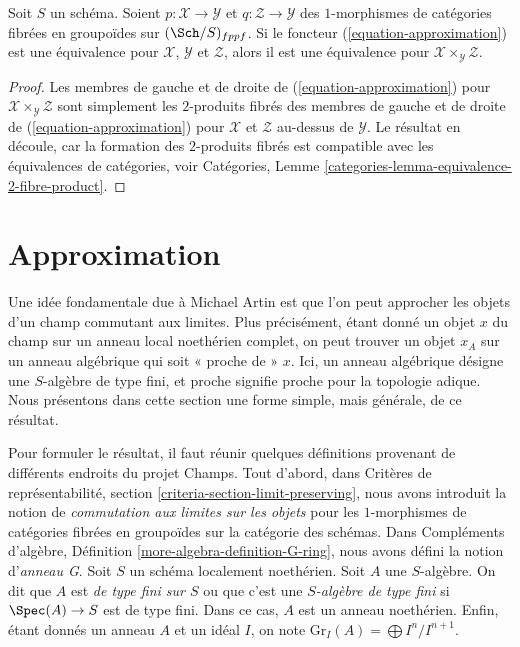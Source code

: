 \begin{lemma}
\label{lemma-fibre-product-effective}
Soit $S$ un schéma. Soient $p : \mathcal{X} \to \mathcal{Y}$ et
$q : \mathcal{Z} \to \mathcal{Y}$ des $1$-morphismes de catégories
fibrées en groupoïdes sur $(\Sch/S)_{fppf}$. Si le foncteur
(\ref{equation-approximation}) est une équivalence pour 
$\mathcal{X}$, $\mathcal{Y}$ et $\mathcal{Z}$, alors il est 
une équivalence pour $\mathcal{X} \times_\mathcal{Y} \mathcal{Z}$.
\end{lemma}

\begin{proof}
Les membres de gauche et de droite de (\ref{equation-approximation})
pour $\mathcal{X} \times_\mathcal{Y} \mathcal{Z}$ sont simplement les $2$-produits
fibrés des membres de gauche et de droite de (\ref{equation-approximation})
pour $\mathcal{X}$ et $\mathcal{Z}$ au-dessus de $\mathcal{Y}$.
Le résultat en découle, car la formation des $2$-produits fibrés est compatible
avec les équivalences de catégories, voir
Catégories, Lemme \ref{categories-lemma-equivalence-2-fibre-product}.
\end{proof}






\section{Approximation}
\label{section-approximation}

\noindent
Une idée fondamentale due à Michael Artin est que l'on peut approcher les
objets d'un champ commutant aux limites. Plus précisément, étant donné un objet $x$
du champ sur un anneau local noethérien complet, on peut trouver
un objet $x_A$ sur un anneau algébrique qui soit « proche de » $x$.
Ici, un anneau algébrique désigne une $S$-algèbre de type fini, et proche
signifie proche pour la topologie adique. Nous présentons dans cette section une forme simple,
mais générale, de ce résultat.

\medskip\noindent
Pour formuler le résultat, il faut réunir quelques définitions provenant de
différents endroits du projet Champs. Tout d'abord, dans
Critères de représentabilité, section \ref{criteria-section-limit-preserving},
nous avons introduit la notion de {\it commutation aux limites sur les objets} pour les $1$-morphismes
de catégories fibrées en groupoïdes sur la catégorie des schémas.
Dans Compléments d'algèbre, Définition \ref{more-algebra-definition-G-ring},
nous avons défini la notion d'{\it anneau G}. Soit $S$ un schéma localement noethérien.
Soit $A$ une $S$-algèbre. On dit que $A$ est {\it de type fini sur $S$}
ou que c'est une {\it $S$-algèbre de type fini} si $\Spec(A) \to S$ est de type fini.
Dans ce cas, $A$ est un anneau noethérien. Enfin, étant donnés un anneau $A$ et un idéal
$I$, on note $\text{Gr}_I(A) = \bigoplus I^n/I^{n + 1}$.

